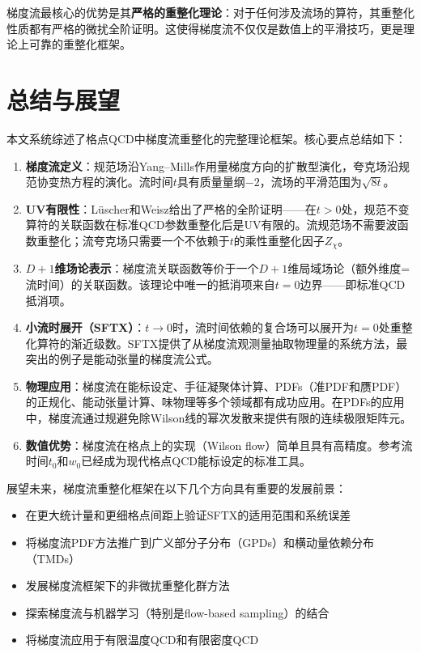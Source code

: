 \documentclass[12pt,a4paper]{ctexart}
\theoremstyle{definition}
\begin{document}
梯度流最核心的优势是其\textbf{严格的重整化理论}：对于任何涉及流场的算符，其重整化性质都有严格的微扰全阶证明。这使得梯度流不仅仅是数值上的平滑技巧，更是理论上可靠的重整化框架。

\section{总结与展望}\label{sec:summary}

本文系统综述了格点QCD中梯度流重整化的完整理论框架。核心要点总结如下：

\begin{enumerate}
    \item \textbf{梯度流定义}：规范场沿Yang--Mills作用量梯度方向的扩散型演化，夸克场沿规范协变热方程的演化。流时间$t$具有质量量纲$-2$，流场的平滑范围为$\sqrt{8t}$。

    \item \textbf{UV有限性}：L\"uscher和Weisz给出了严格的全阶证明——在$t>0$处，规范不变算符的关联函数在标准QCD参数重整化后是UV有限的。流规范场不需要波函数重整化；流夸克场只需要一个不依赖于$t$的乘性重整化因子$Z_\chi$。

    \item \textbf{$D+1$维场论表示}：梯度流关联函数等价于一个$D+1$维局域场论（额外维度=流时间）的关联函数。该理论中唯一的抵消项来自$t=0$边界——即标准QCD抵消项。

    \item \textbf{小流时展开（SFTX）}：$t \to 0$时，流时间依赖的复合场可以展开为$t=0$处重整化算符的渐近级数。SFTX提供了从梯度流观测量抽取物理量的系统方法，最突出的例子是能动张量的梯度流公式。

    \item \textbf{物理应用}：梯度流在能标设定、手征凝聚体计算、PDFs（准PDF和赝PDF）的正规化、能动张量计算、味物理等多个领域都有成功应用。在PDFs的应用中，梯度流通过规避免除Wilson线的幂次发散来提供有限的连续极限矩阵元。

    \item \textbf{数值优势}：梯度流在格点上的实现（Wilson flow）简单且具有高精度。参考流时间$t_0$和$w_0$已经成为现代格点QCD能标设定的标准工具。
\end{enumerate}

展望未来，梯度流重整化框架在以下几个方向具有重要的发展前景：
\begin{itemize}
    \item 在更大统计量和更细格点间距上验证SFTX的适用范围和系统误差
    \item 将梯度流PDF方法推广到广义部分子分布（GPDs）和横动量依赖分布（TMDs）
    \item 发展梯度流框架下的非微扰重整化群方法
    \item 探索梯度流与机器学习（特别是flow-based sampling）的结合
    \item 将梯度流应用于有限温度QCD和有限密度QCD
\end{itemize}
\end{document}

